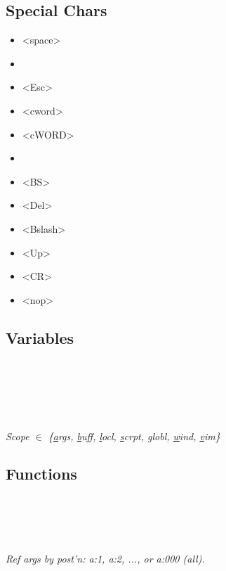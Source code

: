 \subsection*{Special Chars}
\begin{multicols}{3}
\scriptsize
\begin{itemize}[label={}]
    \item <space>
    \item <C-x>
    \item <Esc>
    \item <cword>
    \item <cWORD>
    \item <F7>
    \item <BS>
    \item <Del>
    \item <Bslash>
    \item <Up>
    \item <CR>
    \item <nop>
\end{itemize}
\end{multicols}


\subsection*{Variables}

\\
\\
\\
\\
\\

\textit{Scope $\in$ \{\underline{a}rgs, \underline{b}uff, \underline{l}ocl, \underline{s}crpt, \underline{g}lobl, \underline{w}ind, \underline{v}im\}}

\subsection*{Functions}

\\
\\
\\
\\
\textit{Ref args by post'n: a:1, a:2, ..., or a:000 (all).}\\

